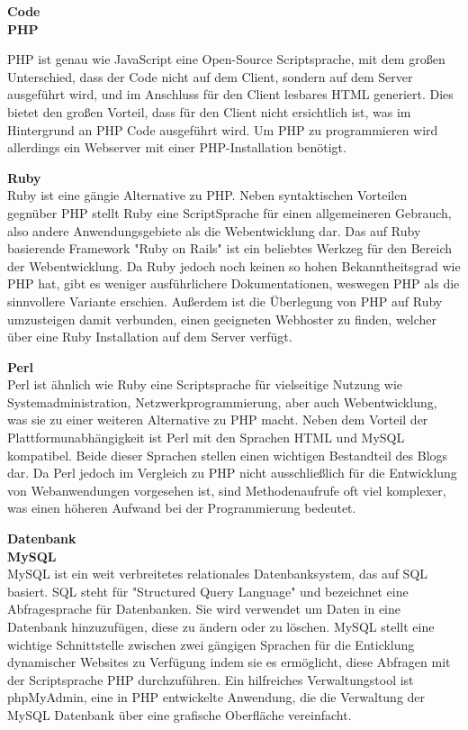     \textbf{Code}\\

    \textbf{PHP}\\
    {PHP\cite{php} ist genau wie JavaScript eine Open-Source Scriptsprache, mit dem großen Unterschied, dass der Code nicht auf dem Client, sondern auf dem Server ausgeführt wird,
    und im Anschluss für den Client lesbares HTML generiert. Dies bietet den großen Vorteil, dass für den Client nicht ersichtlich ist, was im Hintergrund an PHP Code ausgeführt
    wird. Um PHP zu programmieren wird allerdings ein Webserver mit einer PHP-Installation benötigt.

    \textbf{Ruby}\\
    {Ruby\cite{ruby}} ist eine gängie Alternative zu PHP. Neben syntaktischen Vorteilen gegnüber PHP stellt Ruby eine ScriptSprache für einen allgemeineren Gebrauch,
    also andere Anwendungsgebiete als die Webentwicklung dar. Das auf Ruby basierende Framework "Ruby on Rails" ist ein beliebtes Werkzeg für den Bereich der Webentwicklung.
    Da Ruby jedoch noch keinen so hohen Bekanntheitsgrad wie PHP hat, gibt es weniger ausführlichere Dokumentationen, weswegen PHP als die sinnvollere Variante erschien.
    Außerdem ist die Überlegung von PHP auf Ruby umzusteigen damit verbunden, einen geeigneten Webhoster zu finden, welcher über eine Ruby Installation auf dem Server verfügt.

    \textbf{Perl}\\
    {Perl\cite{perl}} ist ähnlich wie Ruby eine Scriptsprache für vielseitige Nutzung wie Systemadministration, Netzwerkprogrammierung, aber auch Webentwicklung, was sie
    zu einer weiteren Alternative zu PHP macht. Neben dem Vorteil der Plattformunabhängigkeit ist Perl mit den Sprachen HTML und MySQL kompatibel. Beide dieser Sprachen stellen
    einen wichtigen Bestandteil des Blogs dar. Da Perl jedoch im Vergleich zu PHP nicht ausschließlich für die Entwicklung von Webanwendungen vorgesehen ist, sind
    Methodenaufrufe oft viel komplexer, was einen höheren Aufwand bei der Programmierung bedeutet.

    \textbf{Datenbank}\\

    \textbf{MySQL}\\
    MySQL ist ein weit verbreitetes relationales Datenbanksystem, das auf SQL basiert. SQL steht für "Structured Query Language" und bezeichnet eine Abfragesprache für Datenbanken.
    Sie wird verwendet um Daten in eine Datenbank hinzuzufügen, diese zu ändern oder zu löschen. MySQL stellt eine wichtige Schnittstelle zwischen zwei gängigen Sprachen für
    die Enticklung dynamischer Websites zu Verfügung indem sie es ermöglicht, diese Abfragen mit der Scriptsprache PHP durchzuführen. Ein hilfreiches Verwaltungstool ist phpMyAdmin,
    eine in PHP entwickelte Anwendung, die die Verwaltung der MySQL Datenbank über eine grafische Oberfläche vereinfacht.

}
